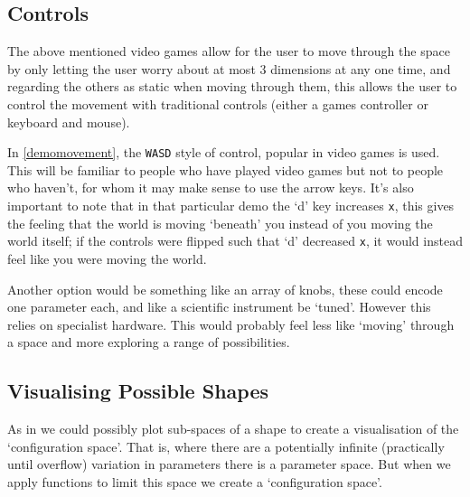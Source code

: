 \subsection{Controls}
The above mentioned video games allow for the user to move through the space by
only letting the user worry about at most 3 dimensions at any one time, and
regarding the others as static when moving through them, this allows the user to
control the movement with traditional controls (either a games controller or
keyboard and mouse).

In \autoref{demomovement}, the \verb|WASD| style of control, popular in video
games is used. This will be familiar to people who have played video games but
not to people who haven't, for whom it may make sense to use the arrow keys.
It's also important to note that in that particular demo the `d' key increases
\verb|x|, this gives the feeling that the world is moving `beneath' you instead
of you moving the world itself; if the controls were flipped such that `d'
decreased \verb|x|, it would instead feel like you were moving the world. 

Another option would be something like an array of knobs, these could encode one
parameter each, and like a scientific instrument be `tuned'. However this relies
on specialist hardware. This would probably feel less like `moving' through a
space and more exploring a range of possibilities.

\subsection{Visualising Possible Shapes}
As in \cite{swayne:dsc2003} we could possibly plot sub-spaces of a shape to
create a visualisation of the `configuration space'. That is, where there are a
potentially infinite (practically until overflow) variation in parameters there
is a parameter space. But when we apply functions to limit this space we create
a `configuration space'.

